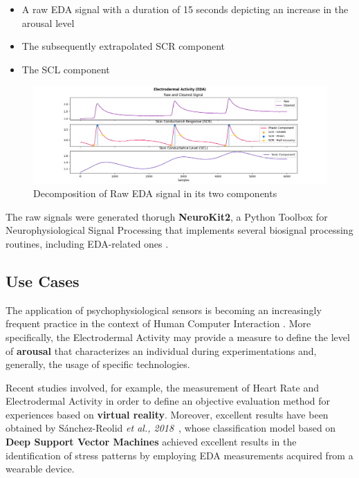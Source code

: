 \begin{itemize}
    \item A raw EDA signal with a duration of 15 seconds depicting an increase in the arousal level
    \item The subsequently extrapolated SCR component
    \item The SCL component
\end{itemize}

\begin{figure}[h]
    \centering
    \includegraphics[width=\textwidth]{./images/eda-simulation.png}
    \caption{Decomposition of Raw EDA signal in its two components}
    \label{fig:eda-example}
\end{figure}

The raw signals were generated thorugh \textbf{NeuroKit2}, a Python Toolbox for Neurophysiological Signal Processing that implements several biosignal processing routines, including EDA-related ones \cite{neurokit}.

\subsection{Use Cases}\label{subsec:eda-usecases}

The application of psychophysiological sensors is becoming an increasingly frequent practice in the context of Human Computer Interaction \cite{eda-hci}. More specifically, the Electrodermal Activity may provide a measure to define the level of \textbf{arousal} that characterizes an individual during experimentations and, generally, the usage of specific technologies.

Recent studies involved, for example, the measurement of Heart Rate and Electrodermal Activity in order to define an objective evaluation method for experiences based on \textbf{virtual reality}. Moreover, excellent results have been obtained by Sánchez-Reolid \textit{et al., 2018}~\cite{edasvm}, whose classification model based on \textbf{Deep Support Vector Machines} achieved excellent results in the identification of stress patterns by employing EDA measurements acquired from a wearable device.

